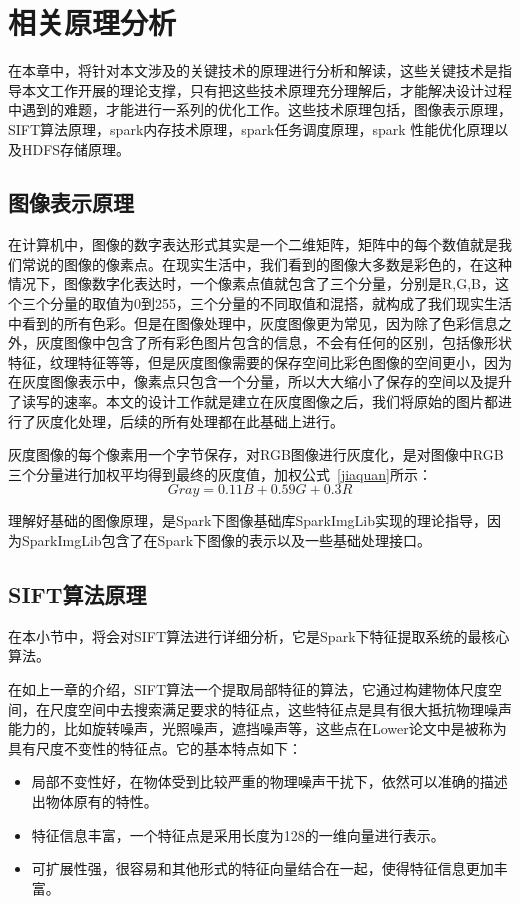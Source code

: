 ﻿\chapter{相关原理分析}
\label{xiangguanyuanli}
在本章中，将针对本文涉及的关键技术的原理进行分析和解读，这些关键技术是指导本文工作开展的理论支撑，只有把这些技术原理充分理解后，才能解决设计过程中遇到的难题，才能进行一系列的优化工作。这些技术原理包括，图像表示原理，SIFT算法原理，spark内存技术原理，spark任务调度原理，spark 性能优化原理以及HDFS存储原理。
\section{图像表示原理}
在计算机中，图像的数字表达形式其实是一个二维矩阵，矩阵中的每个数值就是我们常说的图像的像素点。在现实生活中，我们看到的图像大多数是彩色的，在这种情况下，图像数字化表达时，一个像素点值就包含了三个分量，分别是R,G,B，这个三个分量的取值为0到255，三个分量的不同取值和混搭，就构成了我们现实生活中看到的所有色彩。但是在图像处理中，灰度图像更为常见，因为除了色彩信息之外，灰度图像中包含了所有彩色图片包含的信息，不会有任何的区别，包括像形状特征，纹理特征等等，但是灰度图像需要的保存空间比彩色图像的空间更小，因为在灰度图像表示中，像素点只包含一个分量，所以大大缩小了保存的空间以及提升了读写的速率。本文的设计工作就是建立在灰度图像之后，我们将原始的图片都进行了灰度化处理，后续的所有处理都在此基础上进行。

灰度图像的每个像素用一个字节保存，对RGB图像进行灰度化，是对图像中RGB三个分量进行加权平均得到最终的灰度值，加权公式~\ref{jiaquan}所示：
\begin{equation}\label{jiaquan}
 Gray = 0.11B + 0.59G + 0.3R
\end{equation}

理解好基础的图像原理，是Spark下图像基础库SparkImgLib实现的理论指导，因为SparkImgLib包含了在Spark下图像的表示以及一些基础处理接口。
\section{SIFT算法原理}
\label{sec:sift}
在本小节中，将会对SIFT算法进行详细分析，它是Spark下特征提取系统的最核心算法。

在如上一章的介绍，SIFT算法一个提取局部特征的算法，它通过构建物体尺度空间，在尺度空间中去搜索满足要求的特征点，这些特征点是具有很大抵抗物理噪声能力的，比如旋转噪声，光照噪声，遮挡噪声等，这些点在Lower论文中是被称为具有尺度不变性的特征点。它的基本特点如下：
\begin{itemize}
\item 局部不变性好，在物体受到比较严重的物理噪声干扰下，依然可以准确的描述出物体原有的特性。
\item 特征信息丰富，一个特征点是采用长度为128的一维向量进行表示。
\item 可扩展性强，很容易和其他形式的特征向量结合在一起，使得特征信息更加丰富。
\end{itemize}

